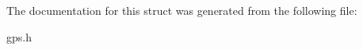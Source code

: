 \begin{DoxyCompactItemize}
\end{tabbing}\end{DoxyCompactItemize}


\-The documentation for this struct was generated from the following file\-:\begin{DoxyCompactItemize}
\item 
gps.\-h\end{DoxyCompactItemize}
